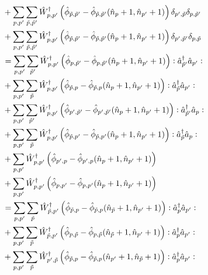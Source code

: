 \begin{appendix}
\begin{itemize}
\begin{align}
&+\Sum_{p, p^\prime}\Sum_{\tilde p,\tilde p^\prime}\hat W_{p,p^\prime}^\dagger \left(\hat\phi_{\tilde p,\tilde p^\prime}-\hat\phi_{\tilde p,\tilde p^\prime}(\hat n_p+1,\hat n_{p^\prime}+1)\right)\delta_{p^\prime,\tilde p}\delta_{p,\tilde p^\prime} \nonumber\\
&+\Sum_{p, p^\prime}\Sum_{\tilde p,\tilde p^\prime}\hat W_{p,p^\prime}^\dagger \left(\hat\phi_{\tilde p,\tilde p^\prime}-\hat\phi_{\tilde p,\tilde p^\prime}(\hat n_p+1,\hat n_{p^\prime}+1)\right)\delta_{p^\prime,\tilde p^\prime}\delta_{p,\tilde p} \nonumber\\
&= \Sum_{p, p^\prime}\Sum_{\tilde p^\prime}\hat W_{p,p^\prime}^\dagger \left(\hat\phi_{ p,\tilde p^\prime}-\hat\phi_{ p,\tilde p^\prime}(\hat n_p+1,\hat n_{p^\prime}+1)\right)\NO\CR_{\tilde p^\prime}\AN_{p^\prime}\NO \\
&+\Sum_{p, p^\prime}\Sum_{\tilde p}\hat W_{p,p^\prime}^\dagger \left(\hat\phi_{\tilde p,p}-\hat\phi_{\tilde p,p}(\hat n_p+1,\hat n_{p^\prime}+1)\right)\NO\CR_{\tilde p}\AN_{p^\prime}\NO \nonumber\\
&+\Sum_{p, p^\prime}\Sum_{\tilde p^\prime}\hat W_{p,p^\prime}^\dagger \left(\hat\phi_{p^\prime,\tilde p^\prime}-\hat\phi_{p^\prime,\tilde p^\prime}(\hat n_p+1,\hat n_{p^\prime}+1)\right)\NO\CR_{\tilde p^\prime}\AN_{p}\NO \nonumber\\
&+\Sum_{p, p^\prime}\Sum_{\tilde p}\hat W_{p,p^\prime}^\dagger \left(\hat\phi_{\tilde p, p^\prime}-\hat\phi_{\tilde p, p^\prime}(\hat n_p+1,\hat n_{p^\prime}+1)\right)\NO\CR_{\tilde p}\AN_{p}\NO \nonumber\\
&+\Sum_{p, p^\prime}\hat W_{p,p^\prime}^\dagger \left(\hat\phi_{p^\prime,p}-\hat\phi_{p^\prime,p}(\hat n_p+1,\hat n_{p^\prime}+1)\right) \nonumber\\
&+\Sum_{p, p^\prime}\hat W_{p,p^\prime}^\dagger \left(\hat\phi_{ p, p^\prime}-\hat\phi_{ p, p^\prime}(\hat n_p+1,\hat n_{p^\prime}+1)\right)\nonumber\\
&= \Sum_{p, p^\prime}\Sum_{\tilde p}\hat W_{\tilde p,p^\prime}^\dagger \left(\hat\phi_{ \tilde p,p}-\hat\phi_{ \tilde p,p}(\hat n_{\tilde p}+1,\hat n_{p^\prime}+1)\right)\NO\CR_{p}\AN_{p^\prime}\NO \\
&+\Sum_{p, p^\prime}\Sum_{\tilde p}\hat W_{\tilde p,p^\prime}^\dagger \left(\hat\phi_{p,\tilde p}-\hat\phi_{p,\tilde p}(\hat n_{\tilde p}+1,\hat n_{p^\prime}+1)\right)\NO\CR_{p}\AN_{p^\prime}\NO \nonumber\\
&+\Sum_{p, p^\prime}\Sum_{\tilde p}\hat W_{p^\prime,\tilde p}^\dagger \left(\hat\phi_{\tilde p,p}-\hat\phi_{\tilde p,p}(\hat n_{p^\prime}+1,\hat n_{\tilde p}+1)\right)\NO\CR_{p}\AN_{p^\prime}\NO \nonumber\\

\end{align}
\end{itemize}
\end{appendix}
